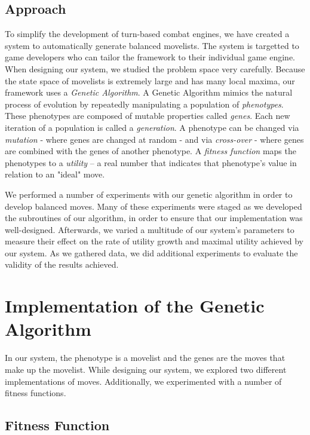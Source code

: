 \documentclass{acm_proc_article-sp}
\begin{document}
\subsection{Approach}

To simplify the development of turn-based combat engines, we have created a system to automatically generate balanced movelists. The system is targetted to game developers who can tailor the framework to their individual game engine.  When designing our system, we studied the problem space very carefully. Because the state space of movelists is extremely large and has many local maxima, our framework uses a \textit{Genetic Algorithm}. A Genetic Algorithm mimics the natural process of evolution by repeatedly manipulating a population of \textit{phenotypes}. These phenotypes are composed of mutable properties called \textit{genes}. Each new iteration of a population is called a \textit{generation}. A phenotype can be changed via \textit{mutation} - where genes are changed at random - and via \textit{cross-over} - where genes are combined with the genes of another phenotype. A \textit{fitness function} maps the phenotypes to a \textit{utility} -- a real number that indicates that phenotype's value in relation to an "ideal" move. 

We performed a number of experiments with our genetic algorithm in order to develop balanced moves. Many of these experiments were staged as we developed the subroutines of our algorithm, in order to ensure that our implementation was well-designed. Afterwards, we varied a multitude of our system's parameters to measure their effect on the rate of utility growth and maximal utility achieved by our system. As we gathered data, we did additional experiments to evaluate the validity of the results achieved.

\section{Implementation of the Genetic Algorithm}

In our system, the phenotype is a movelist and the genes are the moves that make up the movelist. While designing our system, we explored two different implementations of moves. Additionally, we experimented with a number of fitness functions.

\subsection{Fitness Function}
\end{document}
